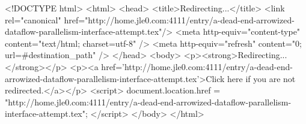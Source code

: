 <!DOCTYPE html>
<html>
<head>
<title>Redirecting...</title>
<link rel="canonical" href="http://home.jle0.com:4111/entry/a-dead-end-arrowized-dataflow-parallelism-interface-attempt.tex"/>
<meta http-equiv="content-type" content="text/html; charset=utf-8" />
<meta http-equiv="refresh" content="0; url=#{destination_path}" />
</head>
<body>
  <p><strong>Redirecting...</strong></p>
  <p><a href='http://home.jle0.com:4111/entry/a-dead-end-arrowized-dataflow-parallelism-interface-attempt.tex'>Click here if you are not redirected.</a></p>
  <script>
    document.location.href = "http://home.jle0.com:4111/entry/a-dead-end-arrowized-dataflow-parallelism-interface-attempt.tex";
  </script>
</body>
</html>
